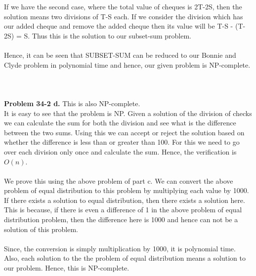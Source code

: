 \documentclass[10pt]{article}
\begin{document}
If we have the second case, where the total value of cheques is 2T-2S, then the solution means two divisions of T-S each. If we consider the division which has our added cheque and remove the added cheque then its value will be T-S - (T-2S) = S. Thus this is the solution to our subset-sum problem.\\\\
Hence, it can be seen that SUBSET-SUM can be reduced to our Bonnie and Clyde problem in polynomial time and hence, our given problem is NP-complete.\\\\\\\\
\textbf{Problem 34-2 d.} This is also NP-complete. \\
It is easy to see that the problem is NP. Given a solution of the division of checks we can calculate the sum for both the division and see what is the difference between the two sums. Using this we can accept or reject the solution based on whether the difference is less than or greater than 100. For this we need to go over each division only once and calculate the sum. Hence, the verification is $O(n)$.\\\\
We prove this using the above problem of part c. We can convert the above problem of equal distribution to this problem by multiplying each value by 1000. If there exists a solution to equal distribution, then there exists a solution here. This is because, if there is even a difference of 1 in the above problem of equal distribution problem, then the difference here is 1000 and hence can not be a solution of this problem.\\\\
Since, the conversion is simply multiplication by 1000, it is polynomial time. Also, each solution to the the problem of equal distribution means a solution to our problem. Hence, this is NP-complete.
\end{document}
